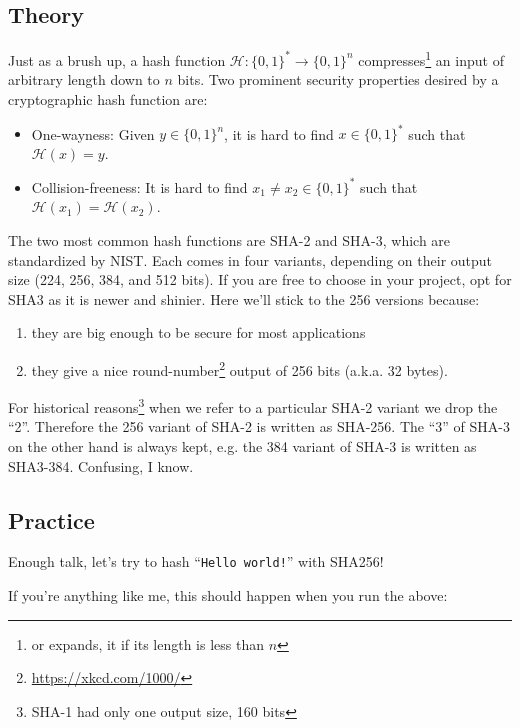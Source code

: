 \documentclass[a4paper,11pt]{article}
\begin{document}
  \subsection{Theory}
    Just as a brush up, a hash function $\mathcal{H} : \{0, 1\}^* \rightarrow
    \{0, 1\}^n$ compresses\footnote{or expands, it if its length is less than
    $n$} an input of arbitrary length down to $n$ bits. Two prominent security
    properties desired by a cryptographic hash function are:
    \begin{itemize}
      \item One-wayness: Given $y \in \{0, 1\}^n$, it is hard to find $x \in
      \{0, 1\}^*$ such that $\mathcal{H}(x) = y$.
      \item Collision-freeness: It is hard to find $x_1 \neq x_2 \in \{0, 1\}^*$
      such that $\mathcal{H}(x_1) = \mathcal{H}(x_2)$.
    \end{itemize}

    The two most common hash functions are SHA-2 and SHA-3, which are
    standardized by NIST. Each comes in four variants, depending on their output
    size (224, 256, 384, and 512 bits). If you are free to choose in your
    project, opt for SHA3 as it is newer and shinier. Here we'll stick to the
    256 versions because:
    \begin{enumerate}
      \item they are big enough to be secure for most applications
      \item they give a nice round-number\footnote{\url{https://xkcd.com/1000/}}
      output of 256 bits (a.k.a. 32 bytes).
    \end{enumerate}

    For historical reasons\footnote{SHA-1 had only one output size, 160 bits}
    when we refer to a particular SHA-2 variant we drop the ``2''. Therefore the
    256 variant of SHA-2 is written as SHA-256. The ``3'' of SHA-3 on the other
    hand is always kept, e.g. the 384 variant of SHA-3 is written as SHA3-384.
    Confusing, I know.

  \subsection{Practice}
    Enough talk, let's try to hash ``\texttt{Hello world!}'' with SHA256!

    \codelisting{\hellosha}
    If you're anything like me, this should happen when you run the above:
    \outputlisting{\hellosha}
\end{document}
